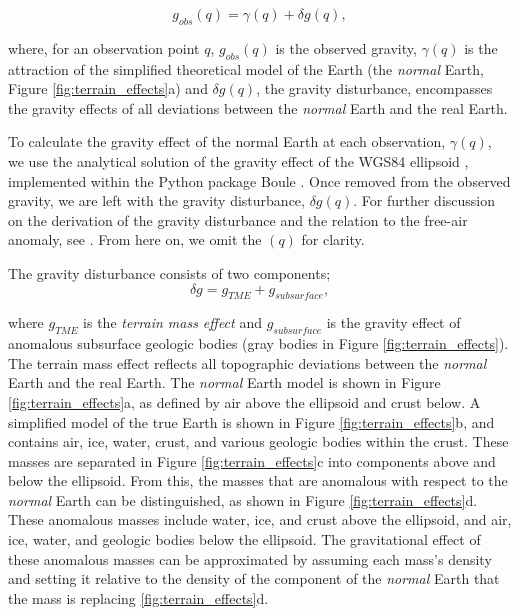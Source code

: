 \documentclass[tc, manuscript]{copernicus}
\begin{document}
\begin{equation}
    g_{obs}(q) = \gamma(q) + \delta g(q),
\end{equation}

\noindent
where, for an observation point $q$, $g_{obs}(q)$ is the observed gravity, $\gamma(q)$ is the attraction of the simplified theoretical model of the Earth (the \textit{normal} Earth, Figure \ref{fig:terrain_effects}a) and $\delta g(q)$, the gravity disturbance, encompasses the gravity effects of all deviations between the \textit{normal} Earth and the real Earth.

To calculate the gravity effect of the normal Earth at each observation, $\gamma(q)$, we use the analytical solution of the gravity effect of the WGS84 ellipsoid \citep{liellipsoid2001}, implemented within the Python package Boule \citep{fatiandoaterraprojectboule2024}. Once removed from the observed gravity, we are left with the gravity disturbance, $\delta g(q)$. For further discussion on the derivation of the gravity disturbance and the relation to the free-air anomaly, see \citet{blakelypotential1995}. From here on, we omit the $(q)$ for clarity.

The gravity disturbance consists of two components;
\begin{equation} \label{eq:disturbance_components}
    \delta g = g_{TME} + g_{subsurface},
\end{equation}

\noindent
where $g_{TME}$ is the \textit{terrain mass effect} and $g_{subsurface}$ is the gravity effect of anomalous subsurface geologic bodies (gray bodies in Figure \ref{fig:terrain_effects}). The terrain mass effect reflects all topographic deviations between the \textit{normal} Earth and the real Earth. The \textit{normal} Earth model is shown in Figure \ref{fig:terrain_effects}a, as defined by air above the ellipsoid and crust below. A simplified model of the true Earth is shown in Figure \ref{fig:terrain_effects}b, and contains air, ice, water, crust, and various geologic bodies within the crust. These masses are separated in Figure \ref{fig:terrain_effects}c into components above and below the ellipsoid. From this, the masses that are anomalous with respect to the \textit{normal} Earth can be distinguished, as shown in Figure \ref{fig:terrain_effects}d. These anomalous masses include water, ice, and crust above the ellipsoid, and air, ice, water, and geologic bodies below the ellipsoid. The gravitational effect of these anomalous masses can be approximated by assuming each mass's density and setting it relative to the density of the component of the \textit{normal} Earth that the mass is replacing \ref{fig:terrain_effects}d.\\
\end{document}

